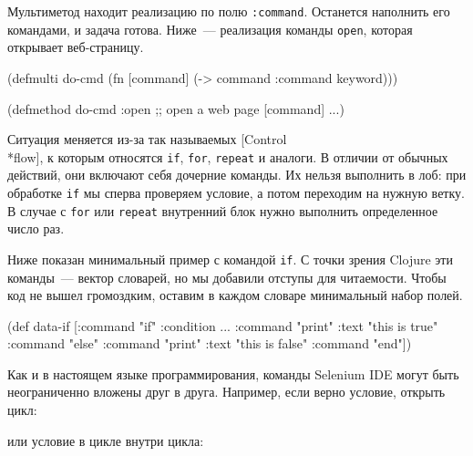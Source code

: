 Мультиметод находит реализацию по полю \verb|:command|. Останется наполнить его
командами, и задача готова. Ниже~--- реализация команды \verb|open|, которая
открывает веб-страницу.

\begin{english}
  \begin{clojure}
(defmulti do-cmd
  (fn [command]
    (-> command :command keyword)))

(defmethod do-cmd :open
  ;; open a web page
  [command]
  ...)
  \end{clojure}
\end{english}

Ситуация меняется из-за так называемых
[Control\\*flow],
к которым относятся \verb|if|, \verb|for|, \verb|repeat| и аналоги. В отличии от
обычных действий, они включают себя дочерние команды. Их нельзя выполнить в лоб:
при обработке \verb|if| мы сперва проверяем условие, а потом переходим на нужную
ветку. В случае с \verb|for| или \verb|repeat| внутренний блок нужно выполнить
определенное число раз.


Ниже показан минимальный пример с командой \texttt{if}. С точки зрения Clojure
эти команды~--- вектор словарей, но мы добавили отступы для читаемости. Чтобы
код не вышел громоздким, оставим в каждом словаре минимальный набор полей.

\begin{english}
  \begin{clojure}
(def data-if
  [{:command "if" :condition ...}
     {:command "print" :text "this is true"}
   {:command "else"}
     {:command "print" :text "this is false"}
   {:command "end"}])
  \end{clojure}
\end{english}

Как и в настоящем языке программирования, команды Selenium IDE могут быть
неограниченно вложены друг в друга. Например, если верно условие, открыть цикл:

\begin{english}
  \begin{clojure}
  \end{clojure}
\end{english}

\noindent
или условие в цикле внутри цикла:

